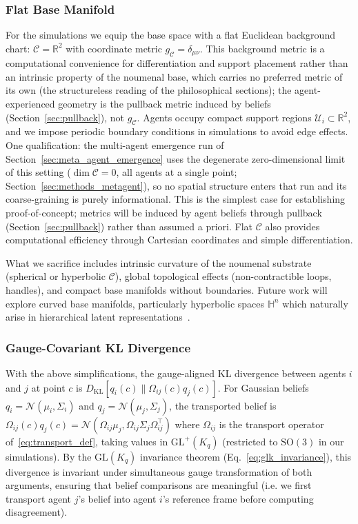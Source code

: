 \documentclass[11pt]{article}
\begin{document}
\subsubsection{Flat Base Manifold}

For the simulations we equip the base space with a flat Euclidean background chart: $\mathcal{C} = \mathbb{R}^2$ with coordinate metric $g_{\mathcal{C}} = \delta_{\mu\nu}$. This background metric is a computational convenience for differentiation and support placement rather than an intrinsic property of the noumenal base, which carries no preferred metric of its own (the structureless reading of the philosophical sections); the agent-experienced geometry is the pullback metric induced by beliefs (Section~\ref{sec:pullback}), not $g_{\mathcal{C}}$. Agents occupy compact support regions $\mathcal{U}_i \subset \mathbb{R}^2$, and we impose periodic boundary conditions in simulations to avoid edge effects. One qualification: the multi-agent emergence run of Section~\ref{sec:meta_agent_emergence} uses the degenerate zero-dimensional limit of this setting ($\dim \mathcal{C} = 0$, all agents at a single point; Section~\ref{sec:methods_metagent}), so no spatial structure enters that run and its coarse-graining is purely informational. This is the simplest case for establishing proof-of-concept; metrics will be induced by agent beliefs through pullback (Section~\ref{sec:pullback}) rather than assumed a priori. Flat $\mathcal{C}$ also provides computational efficiency through Cartesian coordinates and simple differentiation.

What we sacrifice includes intrinsic curvature of the noumenal substrate (spherical or hyperbolic $\mathcal{C}$), global topological effects (non-contractible loops, handles), and compact base manifolds without boundaries. Future work will explore curved base manifolds, particularly hyperbolic spaces $\mathbb{H}^n$ which naturally arise in hierarchical latent representations~\cite{Nickel2017}.

\subsubsection{Gauge-Covariant KL Divergence}

With the above simplifications, the gauge-aligned KL divergence between agents $i$ and $j$ at point $c$ is $D_{\mathrm{KL}}[q_i(c) \| \Omega_{ij}(c)q_j(c)]$. For Gaussian beliefs $q_i = \mathcal{N}(\mu_i, \Sigma_i)$ and $q_j = \mathcal{N}(\mu_j, \Sigma_j)$, the transported belief is $\Omega_{ij}(c)q_j(c) = \mathcal{N}(\Omega_{ij}\mu_j, \Omega_{ij}\Sigma_j\Omega_{ij}^\top)$ where $\Omega_{ij}$ is the transport operator of~\eqref{eq:transport_def}, taking values in $\mathrm{GL}^+(K_q)$ (restricted to $\mathrm{SO}(3)$ in our simulations). By the $\mathrm{GL}(K_q)$ invariance theorem (Eq.~\ref{eq:glk_invariance}), this divergence is invariant under simultaneous gauge transformation of both arguments, ensuring that belief comparisons are meaningful  (i.e. we first transport agent $j$'s belief into agent $i$'s reference frame before computing disagreement).
\end{document}
